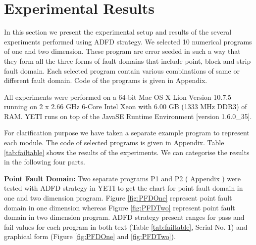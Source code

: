 \documentclass{acm_proc_article-sp}
\begin{document}




\section{Experimental Results} \label{sec:experimentalResults}
In this section we present the experimental setup and results of the several experiments performed using ADFD strategy. We selected 10 numerical programs of one and two dimension. These program are error seeded in such a way that they form all the three forms of fault domains that include point, block and strip fault domain. Each selected program contain various combinations of same or different fault domain. Code of the programs is given in Appendix. 

All experiments were performed on a 64-bit Mac OS X Lion Version 10.7.5 running on 2 x 2.66 GHz 6-Core Intel Xeon with 6.00 GB (1333 MHz DDR3) of RAM. YETI runs on top of the Java\texttrademark  SE Runtime Environment [version 1.6.0\_35]. 

For clarification purpose we have taken a separate example program to represent each module. The code of selected programs is given in Appendix. Table \ref{tab:failtable} shows the results of the experiments. We can categorise the results in the following four parts.





\textbf{Point Fault Domain:}  Two separate programs P1 and P2 ( Appendix ) were tested with ADFD strategy in YETI to get the chart for point fault domain in one and two dimension program. Figure \ref{fig:PFDOne} represent point fault domain in one dimension whereas Figure \ref{fig:PFDTwo} represent point fault domain in two dimension program. ADFD strategy present ranges for pass and fail values for each program in both text (Table \ref{tab:failtable}, Serial No. 1) and graphical form (Figure \ref{fig:PFDOne} and \ref{fig:PFDTwo}). 



\end{document}
